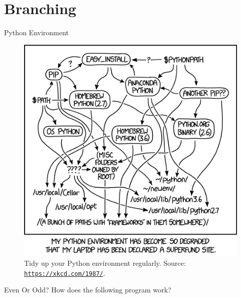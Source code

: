 \documentclass[aspectratio=169, 12pt, xcolor=table]{beamer}
\newcommand{\ohref}[1]{\href{#1}{\texttt{#1}}}
\begin{document}
	\section{Branching}\label{sec:branching}
	
	\sectionframe
	
	\begin{frame}{Python Environment}
		\begin{figure}
			\centering
			\includegraphics[height=0.65\textheight]{./assets/python_environment.png}
			\caption{Tidy up your Python environment regularly. Source: \ohref{https://xkcd.com/1987/}.}
		\end{figure}
	\end{frame}
	
	\begin{frame}{Even Or Odd?}
		How does the following program work?
		
	\end{frame}
\end{document}
